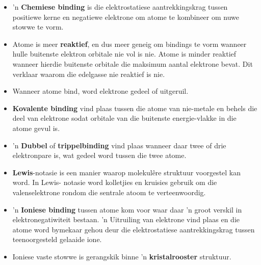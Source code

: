 
            \nopagebreak
      \label{m38689*id147386}\begin{itemize}[noitemsep]
            \label{m38689*uid136}\item 'n \textbf{Chemiese binding} is die elektrostatiese aantrekkingskrag tussen positiewe kerne en negatiewe elektrone om atome te kombineer om nuwe stowwe te vorm.
\label{m38689*uid137}\item Atome is meer \textbf{reaktief}, en dus meer geneig om bindings te vorm wanneer hulle buitenste elektron orbitale nie vol is nie. Atome is minder reaktief wanneer hierdie buitenste orbitale die maksimum aantal elektrone bevat. Dit verklaar waarom die edelgasse nie reaktief is nie.
\label{m38689*uid142}\item Wanneer atome bind, word elektrone gedeel of uitgeruil.
\label{m38689*uid143}\item \textbf{Kovalente binding} vind plaas tussen die atome van nie-metale en behels die deel van elektrone sodat orbitale van die buitenste energie-vlakke in die atome gevul is.
\label{m38689*uid145}\item 'n \textbf{Dubbel} of \textbf{trippelbinding} vind plaas wanneer daar twee of drie elektronpare is, wat gedeel word tussen die twee atome.
\label{m38689*uid147}\item \textbf{Lewis}-notasie is een manier waarop molekulêre struktuur voorgestel kan word. In Lewis- notasie word kolletjies en kruisies gebruik om die valenselektrone rondom die sentrale atoom te verteenwoordig.
\label{m38689*uid150}\item 'n \textbf{Ioniese binding} tussen atome kom voor waar daar 'n groot verskil in elektronegatiwiteit bestaan. 'n Uitruiling van elektrone vind plaas en die atome word bymekaar gehou deur die elektrostatiese  aantrekkingskrag tussen teenoorgesteld gelaaide ione.
\label{m38689*uid151}\item Ioniese vaste stowwe is gerangskik binne 'n \textbf{kristalrooster} struktuur.

\end{itemize}

